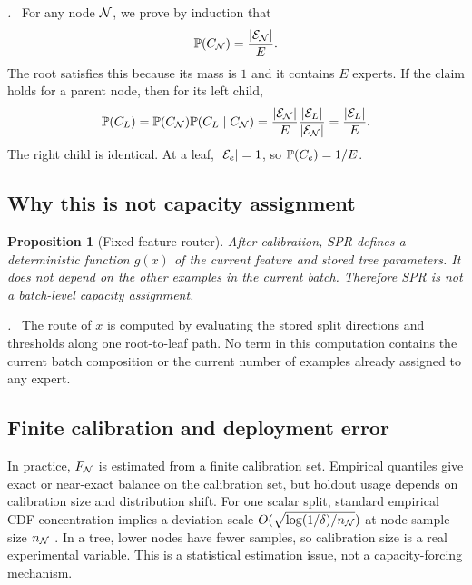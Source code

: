 \documentclass{article}
\newtheorem{proposition}{Proposition}
\renewenvironment{proof}[1][\proofname]{\par\noindent\textit{#1.}\ }{\hfill\qedsymbol\par}
\begin{document}
\begin{proof}
For any node $\mathcal{N}$, we prove by induction that
\begin{equation}
 \mathbb{P}(C_{\mathcal{N}})=\frac{|\mathcal{E}_{\mathcal{N}}|}{E}.
\end{equation}
The root satisfies this because its mass is $1$ and it contains $E$ experts.  If
the claim holds for a parent node, then for its left child,
\begin{equation}
 \mathbb{P}(C_L)=\mathbb{P}(C_{\mathcal{N}})\mathbb{P}(C_L\mid C_{\mathcal{N}})
 =\frac{|\mathcal{E}_{\mathcal{N}}|}{E}\frac{|\mathcal{E}_L|}{|\mathcal{E}_{\mathcal{N}}|}
 =\frac{|\mathcal{E}_L|}{E}.
\end{equation}
The right child is identical.  At a leaf, $|\mathcal{E}_e|=1$, so
$\mathbb{P}(C_e)=1/E$.
\end{proof}

\subsection{Why this is not capacity assignment}

\begin{proposition}[Fixed feature router]
After calibration, SPR defines a deterministic function $g(x)$ of the current
feature and stored tree parameters.  It does not depend on the other examples in
the current batch.  Therefore SPR is not a batch-level capacity assignment.
\end{proposition}

\begin{proof}
The route of $x$ is computed by evaluating the stored split directions and
thresholds along one root-to-leaf path.  No term in this computation contains the
current batch composition or the current number of examples already assigned to
any expert.
\end{proof}

\subsection{Finite calibration and deployment error}

In practice, $F_{\mathcal{N}}$ is estimated from a finite calibration set.  Empirical
quantiles give exact or near-exact balance on the calibration set, but holdout
usage depends on calibration size and distribution shift.  For one scalar split,
standard empirical CDF concentration implies a deviation scale
$O(\sqrt{\log(1/\delta)/n_{\mathcal{N}}})$ at node sample size $n_{\mathcal{N}}$
\citep{dvoretzky1956asymptotic}.  In a tree, lower nodes have fewer samples, so
calibration size is a real experimental variable.  This is a statistical
estimation issue, not a capacity-forcing mechanism.
\end{document}
